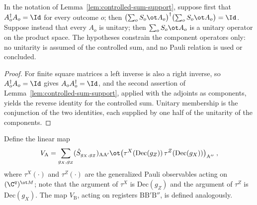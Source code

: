 \begin{lemma}
	\label{lem:controlled-unitary-membership}
	\leanok
	In the notation of Lemma~\ref{lem:controlled-sum-support}, suppose first
	that $A_o^\dagger A_o = \Id$ for every outcome $o$; then
	$\bigl(\sum_o S_o \ot A_o\bigr)^\dagger \bigl(\sum_o S_o \ot A_o\bigr)
	= \Id$. Suppose instead that every $A_o$ is unitary; then
	$\sum_o S_o \ot A_o$ is a unitary operator on the product space. The
	hypotheses constrain the component operators only: no unitarity is assumed
	of the controlled sum, and no Pauli relation is used or concluded.
\end{lemma}
\begin{proof}
	\leanok
	For finite square matrices a left inverse is also a right inverse, so
	$A_o^\dagger A_o = \Id$ gives $A_o A_o^\dagger = \Id$, and the second
	assertion of Lemma~\ref{lem:controlled-sum-support}, applied with the
	adjoints as components, yields the reverse identity for the controlled sum.
	Unitary membership is the conjunction of the two identities, each supplied
	by one half of the unitarity of the components.
\end{proof}

\begin{definition}\label{def:v-swap-unitary}
	\leanok
	Define the linear map
	\[
		V_{\mathrm{A}} = \sum_{g_X,g_Z} (\hat{S}_{g_X,g_Z})_{\mathrm{A}\mathrm{A}'} \ot \bigl(\tau^X(\mathrm{Dec}(g_Z)) \, \tau^Z(\mathrm{Dec}(g_X))\bigr)_{\mathrm{A}''}\;,
	\]
	where $\tau^X(\cdot)$ and $\tau^Z(\cdot)$ are the generalized Pauli observables acting on $(\C^q)^{\ot M}$; note that the argument of $\tau^X$ is $\mathrm{Dec}(g_Z)$ and the argument of $\tau^Z$ is $\mathrm{Dec}(g_X)$. The map $V_{\mathrm{B}}$, acting on registers $\mathrm{B}\mathrm{B}'\mathrm{B}''$, is defined analogously.
\end{definition}

